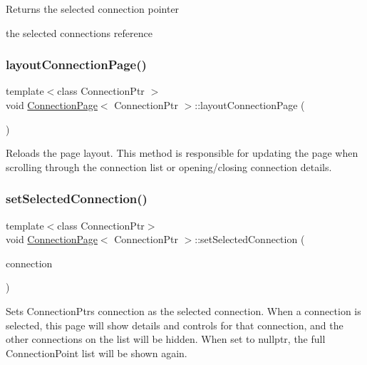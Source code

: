 \begin{DoxyReturn}{Returns}
the selected connection pointer

the selected connection\textquotesingle{}s reference 
\end{DoxyReturn}
\mbox{\label{classConnectionPage_ac9b9f324a3487d4c361c2c0a165a8952}} 
\subsubsection{\texorpdfstring{layout\+Connection\+Page()}{layoutConnectionPage()}}
{\footnotesize\ttfamily template$<$class Connection\+Ptr $>$ \\
void \mbox{\hyperlink{classConnectionPage}{Connection\+Page}}$<$ Connection\+Ptr $>$\+::layout\+Connection\+Page (\begin{DoxyParamCaption}{ }\end{DoxyParamCaption})\hspace{0.3cm}{\ttfamily [protected]}}

Reloads the page layout. This method is responsible for updating the page when scrolling through the connection list or opening/closing connection details. \mbox{\label{classConnectionPage_a672ee3a78cd42ba94b7e687691dfaffe}} 
\subsubsection{\texorpdfstring{set\+Selected\+Connection()}{setSelectedConnection()}}
{\footnotesize\ttfamily template$<$class Connection\+Ptr$>$ \\
void \mbox{\hyperlink{classConnectionPage}{Connection\+Page}}$<$ Connection\+Ptr $>$\+::set\+Selected\+Connection (\begin{DoxyParamCaption}\item[{Connection\+Ptr}]{connection }\end{DoxyParamCaption})\hspace{0.3cm}{\ttfamily [protected]}}

Sets Connection\+Ptr\textquotesingle{}s connection as the selected connection. When a connection is selected, this page will show details and controls for that connection, and the other connections on the list will be hidden. When set to nullptr, the full Connection\+Point list will be shown again.



